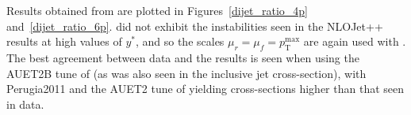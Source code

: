 Results obtained from \powheg are plotted in Figures~\ref{dijet_ratio_4p} and~\ref{dijet_ratio_6p}. \powheg did not exhibit the instabilities seen in the NLOJet++ results at high values of $y^*$, and so the scales $\mu_r = \mu_f = p_\mathrm{T}^\mathrm{max}$ are again used with \powheg. The best agreement between data and the \powheg results is seen when using the AUET2B tune of \pythia (as was also seen in the inclusive jet cross-section), with Perugia2011 and the AUET2 tune of \herwig yielding cross-sections higher than that seen in data.







%
%
%

%


